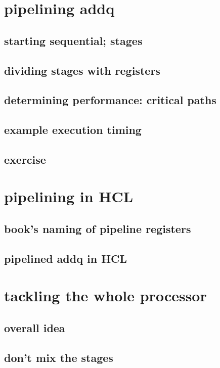 

\section{pipelining addq}

\subsection{starting sequential; stages}



\subsection{dividing stages with registers}



\subsection{determining performance: critical paths}



\subsection{example execution timing}



\subsection{exercise}


\section{pipelining in HCL}

\subsection{book's naming of pipeline registers}



\subsection{pipelined addq in HCL}



\section{tackling the whole processor}

\subsection{overall idea}



\subsection{don't mix the stages}






